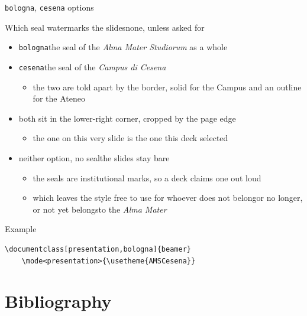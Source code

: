 \documentclass[presentation,cesena,apice]{beamer}\mode<presentation>{\usetheme{AMSCesena}}
\begin{document}
\begin{frame}[c,fragile]{\texttt{bologna}, \texttt{cesena} options}
%
\begin{alertblock}{Which seal watermarks the slides\textemdash{}none, unless asked for}
\begin{itemize}
	\item \texttt{bologna}\textemdash{}the seal of the \emph{Alma Mater Studiorum} as a whole
	\item \texttt{cesena}\textemdash{}the seal of the \emph{Campus di Cesena}
	\begin{itemize}
		\item the two are told apart by the border, solid for the Campus and an outline for the Ateneo
	\end{itemize}
	\item both sit in the lower-right corner, cropped by the page edge
	\begin{itemize}
		\item the one on this very slide is the one this deck selected
	\end{itemize}
	\item \alert{neither option, no seal}\textemdash{}the slides stay bare
	\begin{itemize}
		\item the seals are institutional marks, so a deck claims one out loud
		\item which leaves the style free to use for whoever does not belong\textemdash{}or no longer, or not yet belongs\textemdash{}to the \emph{Alma Mater}
	\end{itemize}
\end{itemize}
\end{alertblock}
%
\begin{exampleblock}{Example}
{\scriptsize\begin{verbatim}
\documentclass[presentation,bologna]{beamer}
    \mode<presentation>{\usetheme{AMSCesena}}
\end{verbatim}} %
\end{exampleblock}
%
\end{frame}

\section{Bibliography}
\end{document}
